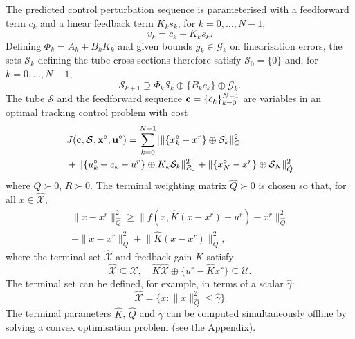 \documentclass[a4paper, 10 pt, conference]{IEEEconf}
\def\G{\mathcal{G}}
\def\S{\mathcal{S}}
\def\U{\mathcal{U}}
\def\X{\mathcal{X}}
\def\bc{{\bf c}}
\def\bS{\boldsymbol{\mathcal{S}}}
\begin{document}
%
The predicted control perturbation sequence is parameterised with a feedforward term $c_k$ and a linear feedback term $K_k s_k$, for $ k = 0,\ldots, N-1$,
\begin{equation}
\label{eq:input}
v_k = c_k + K_k s_k.
\end{equation}
Defining $\Phi_k = A_k +  B_k K_k$ and given bounds $g_k\in\G_k$ on linearisation errors, the sets $\S_k$ defining the tube cross-sections therefore satisfy $\S_0=\{0\}$ and, for $k= 0, \ldots, {N-1}$,
\begin{equation}\label{eq:tube0}
\S_{k+1} \supseteq \Phi_k \S_k \oplus \{ B_k   c_k\} \oplus \G_k.
\end{equation}
The tube $\bS$ and the feedforward sequence $\bc=\{c_k\}_{k=0}^{N-1}$ are variables in an optimal tracking control problem with cost
\begin{align}
& J(\bc,\bS,{\bf x}^\circ,{\bf u}^\circ) =  \sum_{k = 0}^{N-1}\bigl[\lVert \{x_k^\circ - x^r\}\oplus \S_k \rVert_Q^2  
\nonumber \\
&+ \lVert \{u_k^\circ + c_k- u^r\} \oplus K_k\S_k \rVert_R^2\bigr]
+ \lVert \{x_N^\circ - x^r\} \oplus \S_N \rVert_{\hat{Q}}^2
\label{eq:cost}
\end{align}
where $Q \succ 0$, $R \succ 0$. The terminal weighting matrix $\hat{Q} \succ 0$ is chosen so that, for all $x\in\hat{\X}$, 
\begin{multline}\label{eq:Q_N}
\lVert x-x^r\rVert_{\hat{Q}}^2 \geq 
\lVert f(x,\hat{K}(x - x^r)+u^r) - x^r\rVert_{\hat{Q}}^2 
\\
+ \lVert x - x^r \rVert_Q^2
+ \lVert \hat{K}( x - x^r) \rVert_Q^2 ,
\end{multline}
where the terminal set $\hat{\X}$ and feedback gain $\hat{K}$ satisfy
\begin{equation}\label{eq:termset_feas}
\hat{\X}\subseteq\X, \quad 
\hat{K}\hat{\X}\oplus\{u^r-\hat{K} x^r\}\subseteq \U.
\end{equation}
The terminal set can be defined, for example, in terms of a scalar $\hat{\gamma}$:
\begin{equation}\label{eq:termset_def}
\hat{\X} = \{ x : \lVert x\rVert_{\hat{Q}}^2 \leq \hat{\gamma} \}
\end{equation}
The terminal parameters $\hat{K}$, $\hat{Q}$ and $\hat{\gamma}$ can be computed simultaneously offline by solving a convex optimisation problem (see the Appendix).
%
\end{document}
